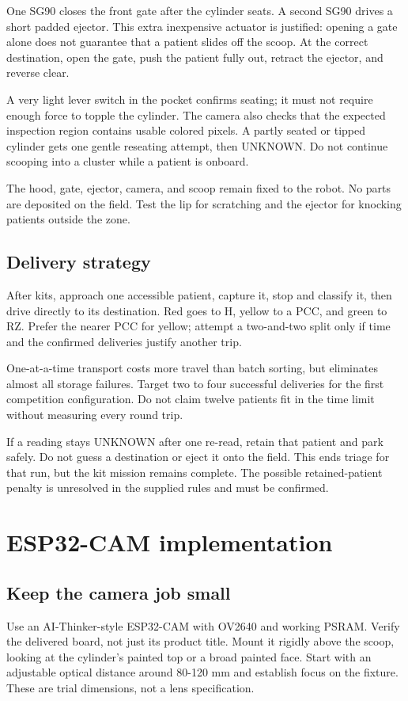 \documentclass[10pt,a4paper]{article}
\begin{document}
One SG90 closes the front gate after the cylinder seats. A second SG90 drives a short padded ejector. This extra inexpensive actuator is justified: opening a gate alone does not guarantee that a patient slides off the scoop. At the correct destination, open the gate, push the patient fully out, retract the ejector, and reverse clear.

A very light lever switch in the pocket confirms seating; it must not require enough force to topple the cylinder. The camera also checks that the expected inspection region contains usable colored pixels. A partly seated or tipped cylinder gets one gentle reseating attempt, then UNKNOWN. Do not continue scooping into a cluster while a patient is onboard.

The hood, gate, ejector, camera, and scoop remain fixed to the robot. No parts are deposited on the field. Test the lip for scratching and the ejector for knocking patients outside the zone.

\subsection{Delivery strategy}
After kits, approach one accessible patient, capture it, stop and classify it, then drive directly to its destination. Red goes to H, yellow to a PCC, and green to RZ. Prefer the nearer PCC for yellow; attempt a two-and-two split only if time and the confirmed deliveries justify another trip.

One-at-a-time transport costs more travel than batch sorting, but eliminates almost all storage failures. Target two to four successful deliveries for the first competition configuration. Do not claim twelve patients fit in the time limit without measuring every round trip.

If a reading stays UNKNOWN after one re-read, retain that patient and park safely. Do not guess a destination or eject it onto the field. This ends triage for that run, but the kit mission remains complete. The possible retained-patient penalty is unresolved in the supplied rules and must be confirmed.

\section{ESP32-CAM implementation}
\subsection{Keep the camera job small}
Use an AI-Thinker-style ESP32-CAM with OV2640 and working PSRAM. Verify the delivered board, not just its product title. Mount it rigidly above the scoop, looking at the cylinder's painted top or a broad painted face. Start with an adjustable optical distance around 80-120 mm and establish focus on the fixture. These are trial dimensions, not a lens specification.
\end{document}

